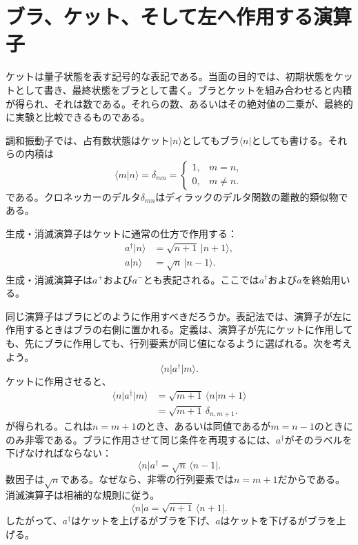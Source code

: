 \section{ブラ、ケット、そして左へ作用する演算子}

ケットは量子状態を表す記号的な表記である。当面の目的では、初期状態をケットとして書き、最終状態をブラとして書く。ブラとケットを組み合わせると内積が得られ、それは数である。それらの数、あるいはその絶対値の二乗が、最終的に実験と比較できるものである。

\begin{classroomqa}
\end{classroomqa}

調和振動子では、占有数状態はケット\(\lvert n\rangle\)としてもブラ\(\langle n\rvert\)としても書ける。それらの内積は
\begin{equation}
\langle m\vert n\rangle=\delta_{mn}
=\begin{cases}
1,&m=n,\\
0,&m\neq n.
\end{cases}
\end{equation}
である。クロネッカーのデルタ\(\delta_{mn}\)はディラックのデルタ関数の離散的類似物である。

生成・消滅演算子はケットに通常の仕方で作用する：
\begin{align}
a^\dagger\lvert n\rangle&=\sqrt{n+1}\,\lvert n+1\rangle,\\
a\lvert n\rangle&=\sqrt n\,\lvert n-1\rangle.
\end{align}
生成・消滅演算子は\(a^+\)および\(a^-\)とも表記される。ここでは\(a^\dagger\)および\(a\)を終始用いる。

同じ演算子はブラにどのように作用すべきだろうか。表記法では、演算子が左に作用するときはブラの右側に置かれる。定義は、演算子が先にケットに作用しても、先にブラに作用しても、行列要素が同じ値になるように選ばれる。次を考えよう。
\begin{equation}
\langle n\rvert a^\dagger\lvert m\rangle.
\end{equation}
ケットに作用させると、
\begin{align}
\langle n\rvert a^\dagger\lvert m\rangle
&=\sqrt{m+1}\,\langle n\vert m+1\rangle\\
&=\sqrt{m+1}\,\delta_{n,m+1}.
\end{align}
が得られる。これは\(n=m+1\)のとき、あるいは同値であるが\(m=n-1\)のときにのみ非零である。ブラに作用させて同じ条件を再現するには、\(a^\dagger\)がそのラベルを下げなければならない：
\begin{equation}
\langle n\rvert a^\dagger
=\sqrt n\,\langle n-1\rvert.
\end{equation}
数因子は\(\sqrt n\)である。なぜなら、非零の行列要素では\(n=m+1\)だからである。消滅演算子は相補的な規則に従う。
\begin{equation}
\langle n\rvert a
=\sqrt{n+1}\,\langle n+1\rvert.
\end{equation}
したがって、\(a^\dagger\)はケットを上げるがブラを下げ、\(a\)はケットを下げるがブラを上げる。

